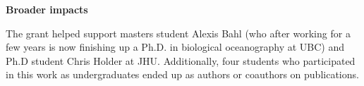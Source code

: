 \documentclass{article}
\begin{document}
{\bf Broader impacts}

The grant helped support masters student Alexis Bahl (who after working for a few years is now finishing up a Ph.D. in biological oceanography at UBC) and  Ph.D student Chris Holder at JHU. Additionally, four students who participated in this work as undergraduates ended up as authors or coauthors on publications. 

 



\end{document}

